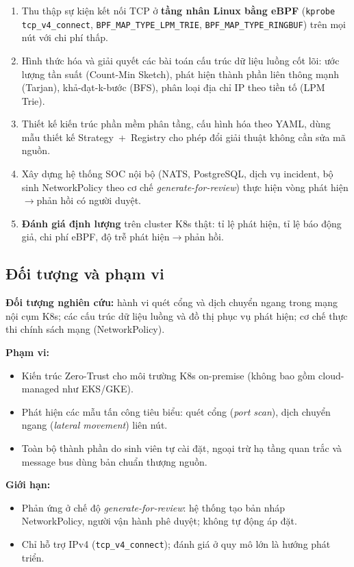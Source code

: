 \begin{enumerate}
    \item Thu thập sự kiện kết nối TCP ở \textbf{tầng nhân Linux bằng eBPF} (\texttt{kprobe tcp\_v4\_connect}, \texttt{BPF\_MAP\_TYPE\_LPM\_TRIE}, \texttt{BPF\_MAP\_TYPE\_RINGBUF}) trên mọi nút với chi phí thấp.
    \item Hình thức hóa và giải quyết các bài toán cấu trúc dữ liệu luồng cốt lõi: ước lượng tần suất (Count-Min Sketch), phát hiện thành phần liên thông mạnh (Tarjan), khả-đạt-k-bước (BFS), phân loại địa chỉ IP theo tiền tố (LPM Trie).
    \item Thiết kế kiến trúc phần mềm phân tầng, cấu hình hóa theo YAML, dùng mẫu thiết kế Strategy~+~Registry cho phép đổi giải thuật không cần sửa mã nguồn.
    \item Xây dựng hệ thống SOC nội bộ (NATS, PostgreSQL, dịch vụ incident, bộ sinh NetworkPolicy theo cơ chế \textit{generate-for-review}) thực hiện vòng phát hiện$\rightarrow$phản hồi có người duyệt.
    \item \textbf{Đánh giá định lượng} trên cluster K8s thật: tỉ lệ phát hiện, tỉ lệ báo động giả, chi phí eBPF, độ trễ phát hiện$\rightarrow$phản hồi.
\end{enumerate}

\subsection{Đối tượng và phạm vi}

\textbf{Đối tượng nghiên cứu:} hành vi quét cổng và dịch chuyển ngang trong mạng nội cụm K8s; các cấu trúc dữ liệu luồng và đồ thị phục vụ phát hiện; cơ chế thực thi chính sách mạng (NetworkPolicy).

\noindent\textbf{Phạm vi:}
\begin{itemize}
    \item Kiến trúc Zero-Trust cho môi trường K8s on-premise (không bao gồm cloud-managed như EKS/GKE).
    \item Phát hiện các mẫu tấn công tiêu biểu: quét cổng (\textit{port scan}), dịch chuyển ngang (\textit{lateral movement}) liên nút.
    \item Toàn bộ thành phần do sinh viên tự cài đặt, ngoại trừ hạ tầng quan trắc và message bus dùng bản chuẩn thượng nguồn.
\end{itemize}

\noindent\textbf{Giới hạn:}
\begin{itemize}
    \item Phản ứng ở chế độ \emph{generate-for-review}: hệ thống tạo bản nháp NetworkPolicy, người vận hành phê duyệt; không tự động áp đặt.
    \item Chỉ hỗ trợ IPv4 (\texttt{tcp\_v4\_connect}); đánh giá ở quy mô lớn là hướng phát triển.
\end{itemize}

